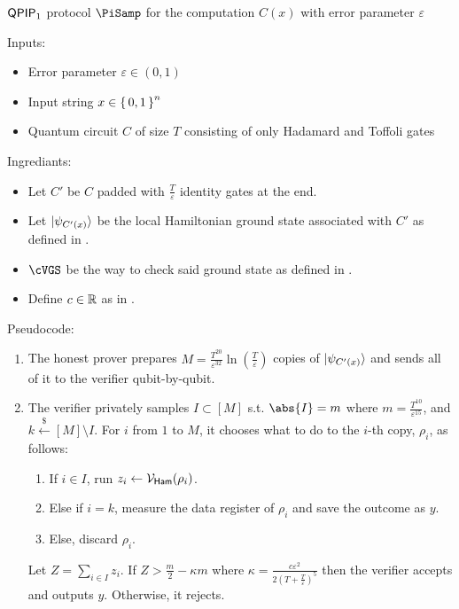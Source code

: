\begin{protocol}{$\operatorname{\mathsf{QPIP}}_1$ protocol $\PiSamp$ for the computation $C(x)$ with error parameter $\varepsilon$}
	\label{ProtoQPIP1}

	Inputs:
	\begin{itemize}
		\item Error parameter $\varepsilon\in(0, 1)$
		\item Input string $x\in\set{0, 1}^n$
		\item Quantum circuit $C$ of size $T$ consisting of only Hadamard and Toffoli gates
	\end{itemize}

	Ingrediants:
	\begin{itemize}
		\item Let $C'$ be $C$ padded with $\frac{T}{\varepsilon}$ identity gates at the end.
		\item Let $\ket{\psi_{C'(x)}}$ be the local Hamiltonian ground state associated with $C'$ as defined in .
		\item $\cVGS$ be the way to check said ground state as defined in .
		\item Define $c\in\mathbb{R}$ as in .
	\end{itemize}

	Pseudocode:
	\begin{enumerate}
		\item The honest prover prepares $M=\frac{T^{20}}{\varepsilon^{32}}\ln(\frac{T}{\varepsilon})$ copies  of $\ket{\psi_{C'(x)}}$ and sends all of it to the verifier qubit-by-qubit.
		\item The verifier privately samples $I\subset[M]$ s.t. $\abs{I}=m$ where $m=\frac{T^{10}}{\varepsilon^{15}}$, and $k\xleftarrow{\$}[M]\setminus I$.
			For $i$ from $1$ to $M$, it chooses what to do to the $i$-th copy, $\rho_i$, as follows:
		\begin{enumerate}
			\item If $i\in I$, run $z_i\leftarrow\mathcal{V}_{\mathsf{Ham}}(\rho_i)$.
			\item Else if $i=k$, measure the data register  of $\rho_i$ and save the outcome as $y$.
			\item Else, discard $\rho_i$.
		\end{enumerate}
			Let $Z=\sum_{i\in I} z_i$. If $Z>\frac{m}{2}-\kappa m$ where $\kappa=\frac{c\varepsilon^2}{2\left(T+\frac{T}{\varepsilon}\right)^5}$ then the verifier accepts and outputs $y$. Otherwise, it rejects.
	\end{enumerate}
\end{protocol}

